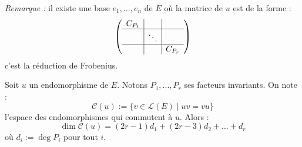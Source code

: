 \documentclass[class=report,crop=false]{standalone}
\begin{document}
{\it Remarque :} il existe une base $e_1,...,e_n$ de $E$ où la matrice de $u$ est de la forme :
\[\left(\begin{array}{c|c|c}
C_{P_1}&&\\\hline
&\ddots&\\\hline
&&C_{P_r}
\end{array}\right)\]
c'est la réduction de Frobenius.


\begin{theoreme}[Frobenius]
Soit $u$ un endomorphisme de $E$. Notons $P_1,...,P_r$ ses facteurs invariants. On note :
\[\mathcal{C}(u):= \{v \in \mathcal{L}(E) \mid uv=vu\}\]
l'espace des endomorphismes qui commutent à $u$. Alors :
\[\dim \mathcal{C}(u)=(2r-1)d_1+(2r-3)d_2+...+d_r\]
où $d_i := \deg P_i$ pour tout $i$.
\end{theoreme}
\end{document}
